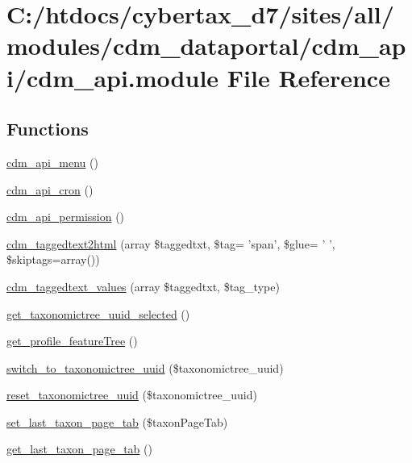 \hypertarget{cdm__api_8module}{\section{C\-:/htdocs/cybertax\-\_\-d7/sites/all/modules/cdm\-\_\-dataportal/cdm\-\_\-api/cdm\-\_\-api.module File Reference}
\label{cdm__api_8module}
}
\subsection*{Functions}
\begin{DoxyCompactItemize}
\item 
\hyperlink{cdm__api_8module_a2299345f873037016e519de82108d320}{cdm\-\_\-api\-\_\-menu} ()
\item 
\hyperlink{cdm__api_8module_a981d93d30a9da24137dffc0e3fa9ed58}{cdm\-\_\-api\-\_\-cron} ()
\item 
\hyperlink{cdm__api_8module_ac40a2bbf0b7cbafaccee6e4eafcc3eac}{cdm\-\_\-api\-\_\-permission} ()
\item 
\hyperlink{cdm__api_8module_a3a6c579cd0f39d20892db2b13d4d1976}{cdm\-\_\-taggedtext2html} (array \$taggedtxt, \$tag= 'span', \$glue= ' ', \$skiptags=array())
\item 
\hyperlink{cdm__api_8module_aa15034b29388f6b73c5c0edd3f733632}{cdm\-\_\-taggedtext\-\_\-values} (array \$taggedtxt, \$tag\-\_\-type)
\item 
\hyperlink{cdm__api_8module_a2c1a9ddae4cfae9fe71cdf4b40186e45}{get\-\_\-taxonomictree\-\_\-uuid\-\_\-selected} ()
\item 
\hyperlink{cdm__api_8module_a7c8f09dee96d57ec93aff58e4e14423a}{get\-\_\-profile\-\_\-feature\-Tree} ()
\item 
\hyperlink{cdm__api_8module_a4ca38c4d638f3653a24908ee5ce8f193}{switch\-\_\-to\-\_\-taxonomictree\-\_\-uuid} (\$taxonomictree\-\_\-uuid)
\item 
\hyperlink{cdm__api_8module_ad22474e08298643d050170ab7037376d}{reset\-\_\-taxonomictree\-\_\-uuid} (\$taxonomictree\-\_\-uuid)
\item 
\hyperlink{cdm__api_8module_ac2fd003cc4b77bde33def6dc27d75130}{set\-\_\-last\-\_\-taxon\-\_\-page\-\_\-tab} (\$taxon\-Page\-Tab)
\item 
\hyperlink{cdm__api_8module_a39a1b0bf19c9b70611e628214fd6bcd8}{get\-\_\-last\-\_\-taxon\-\_\-page\-\_\-tab} ()

\end{DoxyCompactItemize}
